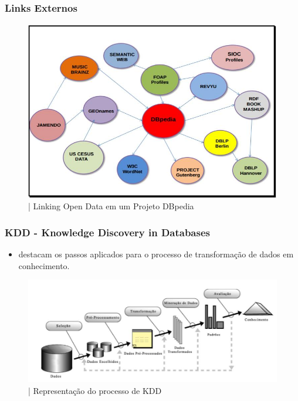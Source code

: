 \documentclass[hyperref={pdfpagelabels=false}]{beamer}
\begin{document}
\begin{frame}
\frametitle{Links Externos}
\begin{figure}[h]
	\centering
		\includegraphics[scale=0.3]{img/Linking_Open_Data_em_um_Projeto_DBpedia}
	\caption{| Linking Open Data em um Projeto DBpedia \cite{Paletta2015}}
	\label{fig:Linking_Open_Data_em_um_Projeto_DBpedia}
\end{figure}
\end{frame}

\begin{frame}
\frametitle{KDD - Knowledge Discovery in Databases}
\begin{itemize}
  \item{\cite{Fayyad1996} destacam os passos aplicados para o processo de transformação de dados em conhecimento.}
\end{itemize}
\begin{figure}[h]
	\centering
		\includegraphics[scale=0.3]{img/Processo_de_KDD.jpg}
	\caption{| Representação do processo de KDD \cite{Fayyad1996}}
	\label{fig:Processo_de_KDD}
\end{figure}
\end{frame}
\end{document}
